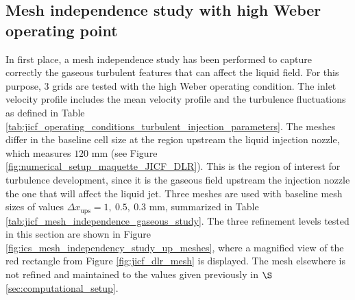 
\subsection{Mesh independence study with high Weber operating point}

In first place, a mesh independence study has been performed to capture correctly the gaseous turbulent features that can affect the liquid field. For this purpose, 3 grids are tested with the high Weber operating condition. The inlet velocity profile includes the mean velocity profile and the turbulence fluctuations as defined in Table \ref{tab:jicf_operating_conditions_turbulent_injection_parameters}. The meshes differ in the baseline cell size at the region upstream the liquid injection nozzle, which measures $120$ mm (see Figure \ref{fig:numerical_setup_maquette_JICF_DLR}). This is the region of interest for turbulence development, since it is the gaseous field upstream the injection nozzle the one that will affect the liquid jet. Three meshes are used with baseline mesh sizes of values $\Delta x_\mathrm{ups} = 1, ~0.5, ~0.3$ mm, summarized in Table \ref{tab:jicf_mesh_independence_gaseous_study}. The three refinement levels tested in this section are shown in Figure \ref{fig:ics_mesh_independency_study_up_meshes}, where a magnified view of the red rectangle from Figure \ref{fig:jicf_dlr_mesh} is displayed. The mesh elsewhere is not refined and maintained to the values given previously in $\S$\ref{sec:computational_setup}. %

